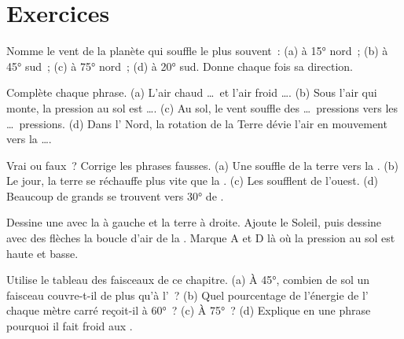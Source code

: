 \section{Exercices}

\begin{exercise}[$\star$]\label{exo:g8:winds-global-circulation:1}
Nomme le vent de la planète qui souffle le plus souvent~: (a) à \ang{15}
nord~; (b) à \ang{45} sud~; (c) à \ang{75} nord~; (d) à \ang{20} sud.
Donne chaque fois sa direction.
\end{exercise}

\begin{exercise}[$\star$]\label{exo:g8:winds-global-circulation:2}
Complète chaque phrase. (a) L'air chaud \dots\ et l'air froid \dots. (b)
Sous l'air qui monte, la pression au sol est \dots. (c) Au sol, le vent
souffle des \dots\ pressions vers les \dots\ pressions. (d) Dans
l' Nord, la rotation de la Terre dévie l'air en mouvement vers
la \dots.
\end{exercise}

\begin{exercise}[$\star$]\label{exo:g8:winds-global-circulation:3}
Vrai ou faux~? Corrige les phrases fausses. (a) Une  souffle
de la terre vers la . (b) Le jour, la terre se réchauffe plus vite que
la . (c) Les  soufflent de l'ouest. (d) Beaucoup de grands
 se trouvent vers \ang{30} de .
\end{exercise}

\begin{exercise}[$\star$]\label{exo:g8:winds-global-circulation:4}
Dessine une  avec la  à gauche et la terre à droite. Ajoute le
Soleil, puis dessine avec des flèches la boucle d'air de la .
Marque A et D là où la pression au sol est haute et basse.
\end{exercise}

\begin{exercise}[$\star\star$]\label{exo:g8:winds-global-circulation:5}
Utilise le tableau des faisceaux de ce chapitre. (a) À \ang{45}, combien
de sol un faisceau couvre-t-il de plus qu'à l'~? (b) Quel
pourcentage de l'énergie de l' chaque mètre carré reçoit-il à
\ang{60}~? (c) À \ang{75}~? (d) Explique en une phrase pourquoi il fait
froid aux .
\end{exercise}

